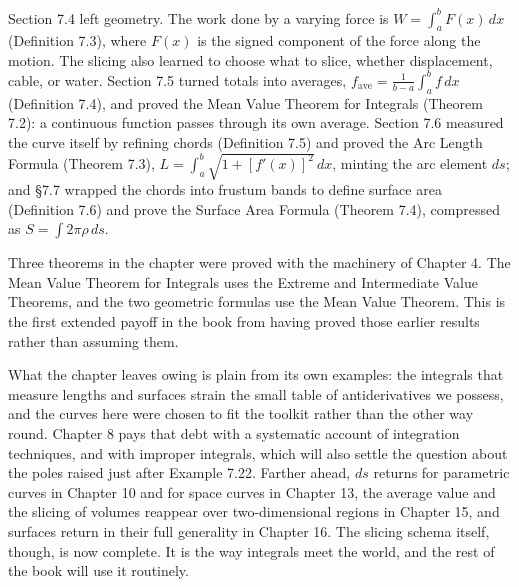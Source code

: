 \documentclass[a4paper,12pt,oneside]{memoir}
\begin{document}
Section 7.4 left geometry. The work done by a varying force is \(W = \int_a^b F(x)\,dx\) (Definition 7.3), where \(F(x)\) is the signed component of the force along the motion. The slicing also learned to choose what to slice, whether displacement, cable, or water. Section 7.5 turned totals into averages, \(f_{\text{ave}} = \frac{1}{b-a}\int_a^b f\,dx\) (Definition 7.4), and proved the Mean Value Theorem for Integrals (Theorem 7.2): a continuous function passes through its own average. Section 7.6 measured the curve itself by refining chords (Definition 7.5) and proved the Arc Length Formula (Theorem 7.3), \(L = \int_a^b \sqrt{1 + [f'(x)]^{2}}\,dx\), minting the arc element \(ds\); and §7.7 wrapped the chords into frustum bands to define surface area (Definition 7.6) and prove the Surface Area Formula (Theorem 7.4), compressed as \(S = \int 2\pi \rho\,ds\).

Three theorems in the chapter were proved with the machinery of Chapter 4. The Mean Value Theorem for Integrals uses the Extreme and Intermediate Value Theorems, and the two geometric formulas use the Mean Value Theorem. This is the first extended payoff in the book from having proved those earlier results rather than assuming them.

What the chapter leaves owing is plain from its own examples: the integrals that measure lengths and surfaces strain the small table of antiderivatives we possess, and the curves here were chosen to fit the toolkit rather than the other way round. Chapter 8 pays that debt with a systematic account of integration techniques, and with improper integrals, which will also settle the question about the poles raised just after Example 7.22. Farther ahead, \(ds\) returns for parametric curves in Chapter 10 and for space curves in Chapter 13, the average value and the slicing of volumes reappear over two-dimensional regions in Chapter 15, and surfaces return in their full generality in Chapter 16. The slicing schema itself, though, is now complete. It is the way integrals meet the world, and the rest of the book will use it routinely.
\end{document}
